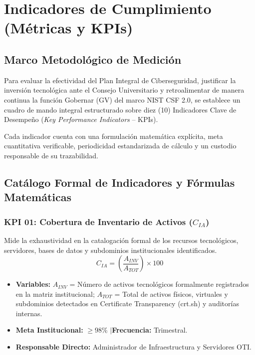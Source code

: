 \chapter{Indicadores de Cumplimiento (Métricas y KPIs)}
\label{ch:indicadores_kpis}

\section{Marco Metodológico de Medición}

Para evaluar la efectividad del Plan Integral de Ciberseguridad, justificar la inversión tecnológica ante el Consejo Universitario y retroalimentar de manera continua la función Gobernar (GV) del marco NIST CSF 2.0, se establece un cuadro de mando integral estructurado sobre diez (10) Indicadores Clave de Desempeño (\textit{Key Performance Indicators} -- KPIs).

Cada indicador cuenta con una formulación matemática explícita, meta cuantitativa verificable, periodicidad estandarizada de cálculo y un custodio responsable de su trazabilidad.

\section{Catálogo Formal de Indicadores y Fórmulas Matemáticas}

\subsection{KPI 01: Cobertura de Inventario de Activos \texorpdfstring{($C_{IA}$)}{(C\_IA)}}
Mide la exhaustividad en la catalogación formal de los recursos tecnológicos, servidores, bases de datos y subdominios institucionales identificados.
\[
C_{IA} = \left( \frac{A_{INV}}{A_{TOT}} \right) \times 100
\]
\begin{itemize}[leftmargin=1.5em, itemsep=1pt]
    \item \textbf{Variables:} $A_{INV}$ = Número de activos tecnológicos formalmente registrados en la matriz institucional; $A_{TOT}$ = Total de activos físicos, virtuales y subdominios detectados en Certificate Transparency (crt.sh) y auditorías internas.
    \item \textbf{Meta Institucional:} $\ge 98\%$ \quad$\vert$\quad \textbf{Frecuencia:} Trimestral.
    \item \textbf{Responsable Directo:} Administrador de Infraestructura y Servidores OTI.
\end{itemize}

